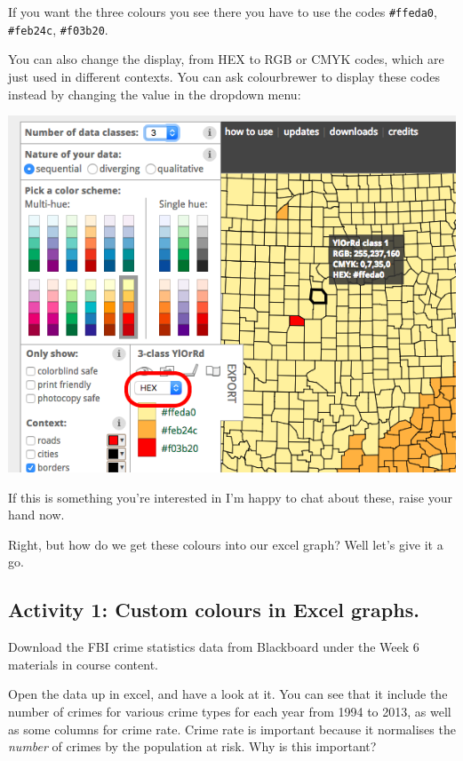 \documentclass[]{book}
\theoremstyle{definition}
\theoremstyle{definition}
\theoremstyle{definition}
\theoremstyle{remark}
\begin{document}
If you want the three colours you see there you have to use the codes
\texttt{\#ffeda0}, \texttt{\#feb24c}, \texttt{\#f03b20}.

You can also change the display, from HEX to RGB or CMYK codes, which
are just used in different contexts. You can ask colourbrewer to display
these codes instead by changing the value in the dropdown menu:

\includegraphics{imgs/choose_col_code.png}

If this is something you're interested in I'm happy to chat about these,
raise your hand now.

Right, but how do we get these colours into our excel graph? Well let's
give it a go.

\hypertarget{activity-1-custom-colours-in-excel-graphs.}{%
\subsection{Activity 1: Custom colours in Excel
graphs.}\label{activity-1-custom-colours-in-excel-graphs.}}

 Download the FBI crime statistics data from Blackboard under the Week 6
materials in course content.

Open the data up in excel, and have a look at it. You can see that it
include the number of crimes for various crime types for each year from
1994 to 2013, as well as some columns for crime rate. Crime rate is
important because it normalises the \emph{number} of crimes by the
population at risk. Why is this important?
\end{document}
